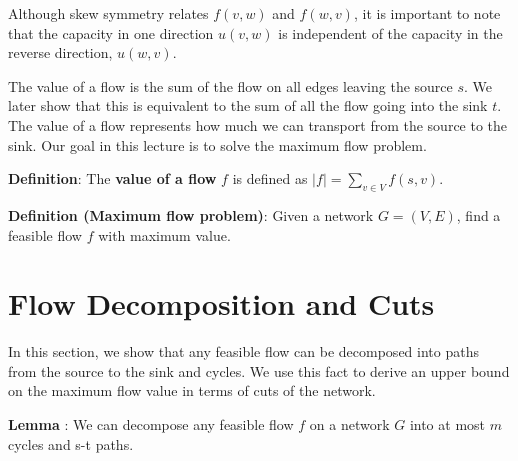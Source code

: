 \documentclass{article}
\begin{document}
Although skew symmetry relates $f(v, w)$ and $f(w, v)$, it is
important to note that the capacity in one direction $u(v, w)$ is independent of
the capacity in the reverse direction, $u(w, v)$.  

The value of a flow is the sum of the flow on all edges leaving the
source $s$.  We later show that this is equivalent to the sum of all
the flow going into the sink $t$.  The value of a flow represents how
much we can transport from the source to the sink.  Our goal in this
lecture is to solve the maximum flow problem. 

\textbf{Definition}:
The \textbf{value of a flow} $f$ is defined as $|f|=\sum_{v\in V} f(s,v)$.

\textbf{Definition (Maximum flow problem)}: Given a network $G = (V, E)$, find a
feasible flow $f$ with maximum value.





\section{Flow Decomposition and Cuts}

In this section, we show that any feasible flow can be decomposed into
paths from the source to the sink and cycles.  We use this fact to
derive an upper bound on the maximum flow value in terms of cuts of
the network.



\textbf{Lemma} \label{Flow Decomposition}:
We can decompose any feasible flow $f$ on a network $G$ into at
most $m$ cycles and s-t paths. 
\end{document}
